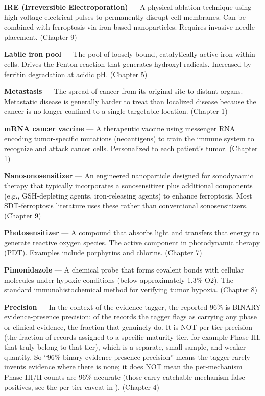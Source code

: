 \documentclass[11pt,twoside,openright]{report}
\begin{document}
\textbf{IRE (Irreversible Electroporation)} --- A physical ablation technique using high-voltage electrical pulses to permanently disrupt cell membranes. Can be combined with ferroptosis via iron-based nanoparticles. Requires invasive needle placement. (Chapter 9)

\textbf{Labile iron pool} --- The pool of loosely bound, catalytically active iron within cells. Drives the Fenton reaction that generates hydroxyl radicals. Increased by ferritin degradation at acidic pH. (Chapter 5)

\textbf{Metastasis} --- The spread of cancer from its original site to distant organs. Metastatic disease is generally harder to treat than localized disease because the cancer is no longer confined to a single targetable location. (Chapter 1)

\textbf{mRNA cancer vaccine} --- A therapeutic vaccine using messenger RNA encoding tumor-specific mutations (neoantigens) to train the immune system to recognize and attack cancer cells. Personalized to each patient's tumor. (Chapter 1)

\textbf{Nanosonosensitizer} --- An engineered nanoparticle designed for sonodynamic therapy that typically incorporates a sonosensitizer plus additional components (e.g., GSH-depleting agents, iron-releasing agents) to enhance ferroptosis. Most SDT-ferroptosis literature uses these rather than conventional sonosensitizers. (Chapter 9)

\textbf{Photosensitizer} --- A compound that absorbs light and transfers that energy to generate reactive oxygen species. The active component in photodynamic therapy (PDT). Examples include porphyrins and chlorins. (Chapter 7)

\textbf{Pimonidazole} --- A chemical probe that forms covalent bonds with cellular molecules under hypoxic conditions (below approximately 1.3\% O2). The standard immunohistochemical method for verifying tumor hypoxia. (Chapter 8)

\textbf{Precision} --- In the context of the evidence tagger, the reported 96\% is BINARY evidence-presence precision: of the records the tagger flags as carrying any phase or clinical evidence, the fraction that genuinely do. It is NOT per-tier precision (the fraction of records assigned to a specific maturity tier, for example Phase III, that truly belong to that tier), which is a separate, small-sample, and weaker quantity. So ``96\% binary evidence-presence precision'' means the tagger rarely invents evidence where there is none; it does NOT mean the per-mechanism Phase III/II counts are 96\% accurate (those carry catchable mechanism false-positives, see the per-tier caveat in ). (Chapter 4)
\end{document}
